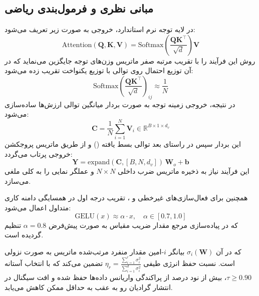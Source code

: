 \subsection{مبانی نظری و فرمول‌بندی ریاضی}
در لایه توجه نرم استاندارد، خروجی به صورت زیر تعریف می‌شود:
\begin{equation}
\text{Attention}(\mathbf{Q}, \mathbf{K}, \mathbf{V}) = \text{Softmax}\left( \frac{\mathbf{Q}\mathbf{K}^\top}{\sqrt{d}} \right) \mathbf{V}
\end{equation}
روش  این فرآیند را با تقریب مرتبه صفر ماتریس وزن‌های توجه جایگزین می‌نماید که در آن توزیع احتمال روی توالی با توزیع یکنواخت تقریب زده می‌شود:
\begin{equation}
\text{Softmax}\left( \frac{\mathbf{Q}\mathbf{K}^\top}{\sqrt{d}} \right)_{ij} \approx \frac{1}{N}
\end{equation}
در نتیجه، خروجی زمینه توجه به صورت بردار میانگین توالی ارزش‌ها ساده‌سازی می‌شود:
\begin{equation}
\mathbf{C} = \frac{1}{N} \sum_{i=1}^N \mathbf{V}_i \in \mathbb{R}^{B \times 1 \times d_v}
\end{equation}
این بردار سپس در راستای بعد توالی بسط یافته () و از طریق ماتریس پروجکشن خروجی پرتاب می‌گردد:
\begin{equation}
\mathbf{Y} = \text{expand}(\mathbf{C}, [B, N, d_v]) \, \mathbf{W}_o + \mathbf{b}
\end{equation}
این فرآیند نیاز به ذخیره ماتریس ضرب داخلی $N \times N$ و عملگر نمایی  را به کلی ملغی می‌سازد.

همچنین برای فعال‌سازی‌های غیرخطی  و ، تقریب درجه اول در همسایگی دامنه کاری متداول اعمال می‌شود:
\begin{equation}
\text{GELU}(x) \approx \alpha \cdot x, \quad \alpha \in [0.7, 1.0]
\end{equation}
که در پیاده‌سازی مرجع مقدار ضریب مقیاس به صورت پیش‌فرض $\alpha = 0.8$ تنظیم گردیده است.

که در آن $\sigma_i(\mathbf{W})$ بیانگر $i$-امین مقدار منفرد مرتب‌شده ماتریس به صورت نزولی است. نسبت حفظ انرژی طیفی $\eta_r = \frac{\sum_{i=1}^r \sigma_i^2}{\sum_{i=1}^{d} \sigma_i^2}$ تضمین می‌کند که با انتخاب آستانه $\tau \ge 0.90$، بیش از نود درصد از پراکندگی واریانس داده‌ها حفظ شده و افت سیگنال در انتشار گرادیان رو به عقب به حداقل ممکن کاهش می‌یابد.

